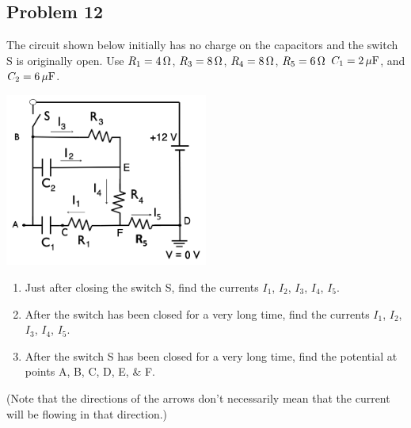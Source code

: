 \subsection*{Problem 12}
The circuit shown below initially has no charge on the capacitors and the switch S is
originally open. Use $R_1 = 4\,\mathrm{\Omega}$, $R_3 = 8\,\mathrm{\Omega}$, $R_4 = 8\,\mathrm{\Omega}$, $R_5 = 6\,\mathrm{\Omega}$ $C_1 =2\,\mathrm{\mu F}$, and $C_2 = 6\,\mathrm{\mu F}$.\\
\centerline{\includegraphics[width=0.5\textwidth]{Images/P12img1.png}}
\begin{enumerate}
    \item Just after closing the switch S, find the currents $I_1$, $I_2$, $I_3$, $I_4$, $I_5$.
    \item After the switch has been closed for a very long time, find the currents $I_1$, $I_2$, $I_3$, $I_4$, $I_5$.
    \item After the switch S has been closed for a very long time, find the potential at points A, B, C, D, E, \& F.
\end{enumerate}
(Note that the directions of the arrows don't necessarily mean that the current will be flowing in that direction.)
